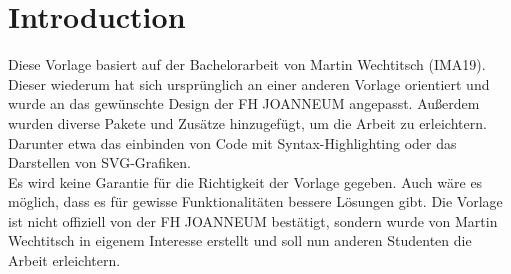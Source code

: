 \chapter{Introduction}
\label{ch:introduction}

Diese Vorlage basiert auf der Bachelorarbeit von Martin Wechtitsch (IMA19).\\
Dieser wiederum hat sich ursprünglich an einer anderen Vorlage orientiert und wurde an das gewünschte Design der FH JOANNEUM angepasst.
Außerdem wurden diverse Pakete und Zusätze hinzugefügt, um die Arbeit zu erleichtern.
Darunter etwa das einbinden von Code mit Syntax-Highlighting oder das Darstellen von SVG-Grafiken.\\

Es wird keine Garantie für die Richtigkeit der Vorlage gegeben.
Auch wäre es möglich, dass es für gewisse Funktionalitäten bessere Lösungen gibt.
Die Vorlage ist nicht offiziell von der FH JOANNEUM bestätigt, sondern wurde von Martin Wechtitsch in eigenem Interesse erstellt und soll nun anderen Studenten die Arbeit erleichtern.\\
